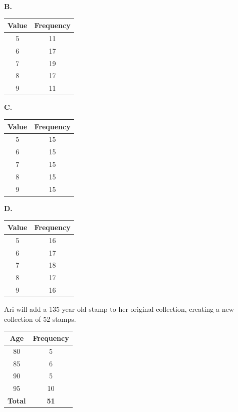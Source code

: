 \vspace{0.75em}

\textbf{B.}
\begin{tabular}{|c|c|}
\hline
Value & Frequency \\
\hline
5 & 11 \\
6 & 17 \\
7 & 19 \\
8 & 17 \\
9 & 11 \\
\hline
\end{tabular}

\vspace{0.75em}

\textbf{C.}
\begin{tabular}{|c|c|}
\hline
Value & Frequency \\
\hline
5 & 15 \\
6 & 15 \\
7 & 15 \\
8 & 15 \\
9 & 15 \\
\hline
\end{tabular}

\vspace{0.75em}

\textbf{D.}
\begin{tabular}{|c|c|}
\hline
Value & Frequency \\
\hline
5 & 16 \\
6 & 17 \\
7 & 18 \\
8 & 17 \\
9 & 16 \\
\hline
\end{tabular}

\vspace{0.75em}


\vspace{2em}
\newpage

\noindent\markforreview
\vspace{1em}

Ari will add a 135-year-old stamp to her original collection, creating a new collection of 52 stamps.

\begin{center}
\begin{tabular}{|c|c|}
\hline
Age & Frequency \\
\hline
80 & 5 \\
85 & 6 \\
90 & 5 \\
95 & 10 \\
\textbf{Total} & \textbf{51} \\
\hline
\end{tabular}
\end{center}

